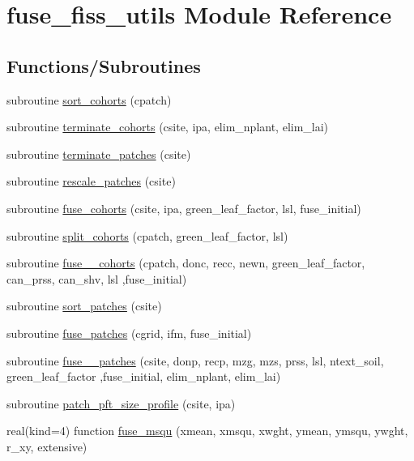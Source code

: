\hypertarget{namespacefuse__fiss__utils}{}\section{fuse\+\_\+fiss\+\_\+utils Module Reference}
\label{namespacefuse__fiss__utils}
\subsection*{Functions/\+Subroutines}
\begin{DoxyCompactItemize}
\item 
subroutine \hyperlink{namespacefuse__fiss__utils_a31e4835d2465d1400c7cbbb51976b341}{sort\+\_\+cohorts} (cpatch)
\item 
subroutine \hyperlink{namespacefuse__fiss__utils_a5dc8f0ad95ff159ac69570ac55856524}{terminate\+\_\+cohorts} (csite, ipa, elim\+\_\+nplant, elim\+\_\+lai)
\item 
subroutine \hyperlink{namespacefuse__fiss__utils_a480df748f946b24daa940c15d72abfe2}{terminate\+\_\+patches} (csite)
\item 
subroutine \hyperlink{namespacefuse__fiss__utils_ab3b0eeed8a63cc2f4b866ac243e25ec6}{rescale\+\_\+patches} (csite)
\item 
subroutine \hyperlink{namespacefuse__fiss__utils_adebb5663823fc54b5e7f28ce1e365afe}{fuse\+\_\+cohorts} (csite, ipa, green\+\_\+leaf\+\_\+factor, lsl, fuse\+\_\+initial)
\item 
subroutine \hyperlink{namespacefuse__fiss__utils_a57242703afe9eb00a9aa836ff925bffc}{split\+\_\+cohorts} (cpatch, green\+\_\+leaf\+\_\+factor, lsl)
\item 
subroutine \hyperlink{namespacefuse__fiss__utils_ad49d6cf9affbac930e3d5be9c8baae39}{fuse\+\_\+\_\+cohorts} (cpatch, donc, recc, newn, green\+\_\+leaf\+\_\+factor, can\+\_\+prss, can\+\_\+shv, lsl                                                                                                           ,fuse\+\_\+initial)
\item 
subroutine \hyperlink{namespacefuse__fiss__utils_a546d7beff2f991a07c8fbba91921ce5f}{sort\+\_\+patches} (csite)
\item 
subroutine \hyperlink{namespacefuse__fiss__utils_aee30640ff825246fb4c9f5f1f41470be}{fuse\+\_\+patches} (cgrid, ifm, fuse\+\_\+initial)
\item 
subroutine \hyperlink{namespacefuse__fiss__utils_ac265957681eedff0e33bd5c3cdeca31d}{fuse\+\_\+\_\+patches} (csite, donp, recp, mzg, mzs, prss, lsl, ntext\+\_\+soil, green\+\_\+leaf\+\_\+factor                                                                                                           ,fuse\+\_\+initial, elim\+\_\+nplant, elim\+\_\+lai)
\item 
subroutine \hyperlink{namespacefuse__fiss__utils_ac7660eaa2d7565040ef120ac454ef406}{patch\+\_\+pft\+\_\+size\+\_\+profile} (csite, ipa)
\item 
real(kind=4) function \hyperlink{namespacefuse__fiss__utils_aae52213c98fe3ffb3ecde24d8ffc6e03}{fuse\+\_\+msqu} (xmean, xmsqu, xwght, ymean, ymsqu, ywght, r\+\_\+xy, extensive)
\end{DoxyCompactItemize}


